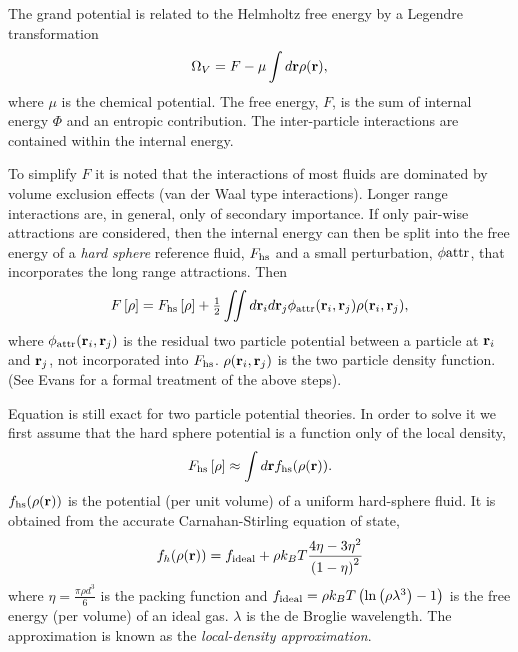 The grand potential is related to the Helmholtz free energy by a Legendre transformation
\begin{align}
  \Omega_V = F -  \mu \int d\textbf{r} \rho(\textbf{r}), \label{eqn:OmegaVDefn}
\end{align}
where $\mu$ is the chemical potential.
The free energy, $F$, is the sum of  internal energy $\Phi$ and an  entropic contribution.
The inter-particle interactions are contained within the internal energy.

To simplify $F$ it is noted that  the interactions of most fluids are dominated  by volume exclusion effects (van der Waal type interactions).
Longer range interactions are, in general, only of secondary importance.
If only pair-wise attractions are considered, then the internal energy can then be split into the 
free energy of a {\em hard sphere} reference fluid, $F_{\text{hs}}$ 
and a small perturbation, $\phi\text{attr}$, that incorporates the long range attractions.
Then 
\begin{align}
   F\left[ \rho \right] = F_{\text{hs}}\left[ \rho \right] +\tfrac{1}{2}   \iint d \textbf{r}_i d\textbf{r}_j \phi_{\text{attr}}( \textbf{r}_i, \textbf{r}_j)\rho(\textbf{r}_i, \textbf{r}_j),  \label{eqn:F_pert}
\end{align}
where $\phi_{\text{attr}}(\textbf{r}_i, \textbf{r}_j)$ is the residual two particle potential between a particle at $\textbf{r}_i$ and $\textbf{r}_j$,
not incorporated into $F_{\text{hs}}$.
$\rho(\textbf{r}_i, \textbf{r}_j) $ is the two particle density function.
(See Evans\cite{Evans1992} for a formal treatment of the above steps).

Equation  is still exact for two particle potential theories.
In order to solve it we first  assume that the  hard sphere potential is a function only of the local density,
\begin{align}
  F_{\text{hs}} \left[ \rho \right] \approx \int d\textbf{r} f_{\text{hs}}(\rho(\textbf{r})). \label{eqn:LDA}
\end{align}
$f_{\text{hs}}(\rho(\textbf{r}))$ is the potential (per unit volume) of a uniform  hard-sphere fluid\cite{Evans1992}.
It is obtained from the accurate  Carnahan-Stirling equation of state,
\begin{align}
    f_h(\rho(\textbf{r})) =  f_{\text{ideal}} + \rho k_B T\frac{4\eta - 3\eta^2}{\left( 1-\eta \right)^2}
\end{align}
where $\eta =  \frac{\pi \rho d^3}{6}$ is the packing function and $f_{\text{ideal}} =  \rho k_B T\left( \ln \left( \rho \lambda^3 \right) -1 \right)$ is the free energy (per volume) of an ideal gas.
$\lambda$ is the de Broglie wavelength.
%
The approximation  is known as the {\em local-density approximation}.

